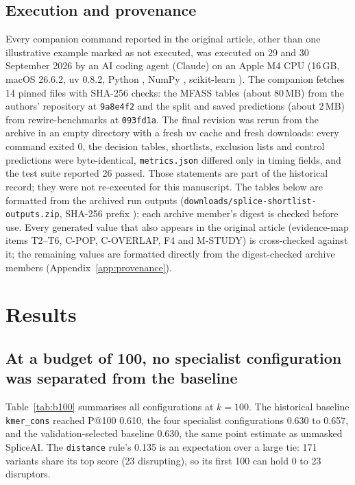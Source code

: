\documentclass[11pt]{article}
\makeatletter
\newcommand{\cfg}[1]{\texttt{#1}}
\newcommand{\pk}[1]{P@#1}
\makeatother
\begin{document}
\subsection{Execution and provenance}\label{sec:provenance}
Every companion command reported in the original article, other than one illustrative example marked as not
executed, was executed on 29 and 30 September 2026 by an AI coding agent (Claude) on an Apple M4
CPU (16\,GB, macOS 26.6.2, uv 0.8.2, Python \EnvPython, NumPy \EnvNumpy, scikit-learn \EnvSklearn). The
companion fetches 14 pinned files with SHA-256 checks: the MFASS tables (about 80\,MB) from the authors'
repository at \texttt{9a8e4f2} and the split and saved predictions (about 2\,MB) from rewire-benchmarks at
\texttt{093fd1a}. The final revision was rerun from the archive in an empty directory with a fresh uv cache and
fresh downloads: every command exited 0, the decision tables, shortlists, exclusion lists and control
predictions were byte-identical, \texttt{metrics.json} differed only in timing fields, and the test suite
reported 26 passed. Those statements are part of the historical record; they were not re-executed for this
manuscript. The tables below are formatted from the archived run outputs
(\texttt{downloads/splice-shortlist-outputs.zip}, SHA-256 prefix \texttt{\OutputsZipShort}); each archive member's
digest is checked before use. Every generated value that also appears in the original article (evidence-map items
T2--T6, C-POP, C-OVERLAP, F4 and M-STUDY) is cross-checked against it; the remaining values are formatted directly
from the digest-checked archive members (Appendix~\ref{app:provenance}).

\section{Results}\label{sec:results}

\subsection{At a budget of 100, no specialist configuration was separated from the baseline}\label{sec:b100}
Table~\ref{tab:b100} summarises all configurations at $k=100$. The historical baseline \cfg{kmer\_cons}
reached \pk{100} 0.610, the four specialist configurations 0.630 to 0.657, and the validation-selected baseline
0.630, the same point estimate as unmasked SpliceAI. The \cfg{distance} rule's 0.135 is an expectation over a
large tie: 171 variants share its top score (23 disrupting), so its first 100 can hold 0 to 23 disruptors.
\end{document}
